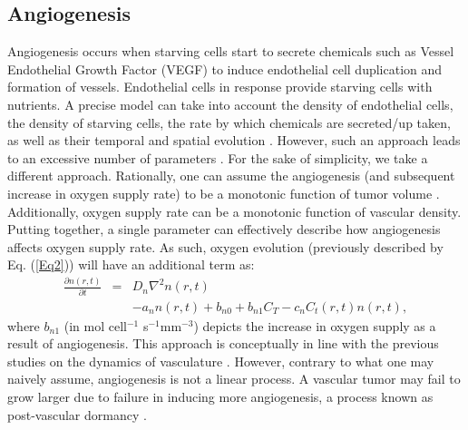 \documentclass[aps,prl, superscriptaddress,groupedaddress]{revtex4}  %
\begin{document}
	\subsection{Angiogenesis}
 Angiogenesis occurs when starving cells start to secrete chemicals such as  Vessel Endothelial Growth Factor (VEGF) to induce endothelial cell duplication and formation of vessels. Endothelial cells in response provide starving cells with nutrients. A precise model can take into account the density of endothelial cells, the density of starving cells, the rate by which chemicals are secreted/up taken, as well as their temporal and spatial evolution \cite{scalerandi2002inhibition, phillips2020hybrid}. However, such an approach leads to an excessive number of parameters \cite{phillips2020hybrid, zheng2018mathematical}. For the sake of simplicity, we take a different approach. Rationally, one can assume the angiogenesis (and subsequent increase in oxygen supply rate) to be a monotonic function of tumor volume \cite{d2007rapidly}. Additionally, oxygen supply rate can be a monotonic function of vascular density. Putting together, a single parameter can effectively describe how angiogenesis affects oxygen supply rate. As such, oxygen evolution (previously described by Eq. (\ref{Eq2})) will have an additional term as: 
		\begin{eqnarray}
			\frac{\partial n(r,t)}{\partial t}&=&D_n\nabla^2 n(r,t)\\&& - a_n n(r,t)+ b_{n0}+ b_{n1} C_T - c_n C_t(r,t) n(r,t)\nonumber,
			\label{Eq6}
		\end{eqnarray}
		where $b_{n1}$ (in mol cell$^{-1}$ s$^{-1}$mm$^{-3}$) depicts the increase in oxygen supply as a result of angiogenesis.  This approach is conceptually in line with the previous studies on the dynamics of vasculature \cite{d2007rapidly, rieger2015integrative, tracqui2009biophysical, xu2016mathematical}. However, contrary to what one may naively assume, angiogenesis is not a linear process. A  vascular tumor may fail to grow larger due to failure in inducing more angiogenesis, a process known as post-vascular dormancy \cite{hahnfeldt1999tumor, naumov2008tumor}. 
	
\end{document}
